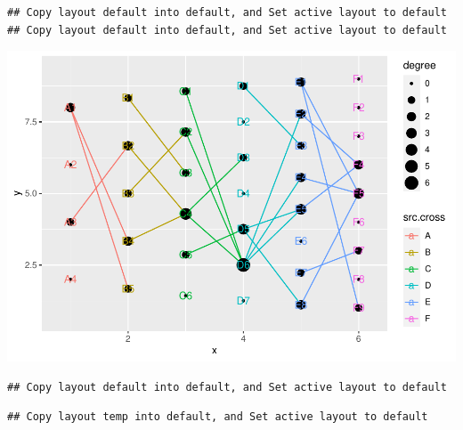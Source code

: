 \documentclass[
]{article}
\newenvironment{Shaded}{\begin{snugshade}}{\end{snugshade}}
\newcommand{\CommentTok}[1]{\textcolor[rgb]{0.56,0.35,0.01}{\textit{#1}}}
\newcommand{\KeywordTok}[1]{\textcolor[rgb]{0.13,0.29,0.53}{\textbf{#1}}}
\newcommand{\NormalTok}[1]{#1}
\newcommand{\OperatorTok}[1]{\textcolor[rgb]{0.81,0.36,0.00}{\textbf{#1}}}
\newcommand{\StringTok}[1]{\textcolor[rgb]{0.31,0.60,0.02}{#1}}
\begin{document}
\begin{Shaded}
\end{Shaded}

\begin{verbatim}
## Copy layout default into default, and Set active layout to default
## Copy layout default into default, and Set active layout to default
\end{verbatim}

\includegraphics{ReadMe_files/figure-latex/unnamed-chunk-7-2.pdf}

\begin{Shaded}
\end{Shaded}

\begin{verbatim}
## Copy layout default into default, and Set active layout to default
\end{verbatim}

\begin{verbatim}
## Copy layout temp into default, and Set active layout to default
\end{verbatim}
\end{document}
